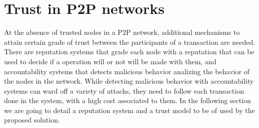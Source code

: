 \section{Trust in P2P networks}

At the absence of trusted nodes in a P2P network, additional mechanisms to
attain certain grade of trust between the participants of a transaction are
needed. There are reputation systems that grade each node with a reputation
that can be used to decide if a operation will or not will be made with them,
and accountability systems that detects malicious behavior analizing the
behavior of the nodes in the network. While  detecting malicious behavior with
accountability systems can ward off a variety of attacks, they need to follow
each transaction done in the system, with a high cost associated to them.
 In the following section we are going to
detail a reputation system and a trust model to be of used by the proposed
solution.




